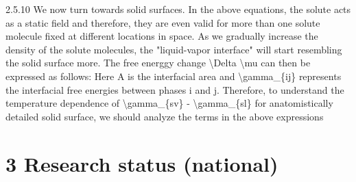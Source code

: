 \par 2.5.10  We now turn towards solid surfaces. In the above equations, the solute acts as a static field and therefore, they are even valid for more than one solute molecule fixed at different locations in space. As we gradually increase the density of the solute molecules, the "liquid-vapor interface" will start  resembling the solid surface more. The free energgy change \textbackslash Delta \textbackslash mu can then be expressed as follows: Here A is the interfacial area and \textbackslash gamma\_\{ij\} represents the interfacial free energies between phases i and j. Therefore, to understand the temperature dependence of \textbackslash gamma\_\{sv\} - \textbackslash gamma\_\{sl\} for anatomistically detailed solid surface, we should analyze the terms in the above expressions\section{3 Research status (national)}

